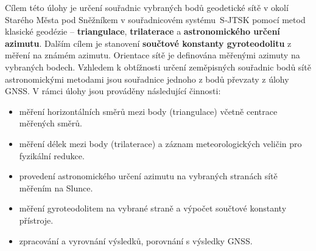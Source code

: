 
Cílem této úlohy je určení souřadnic vybraných bodů geodetické sítě v okolí Starého Města pod Sněžníkem v souřadnicovém systému~S‑JTSK pomocí metod klasické geodézie – \textbf{triangulace}, \textbf{trilaterace} a \textbf{astronomického určení azimutu}. Dalším cílem je stanovení \textbf{součtové konstanty gyroteodolitu} z měření na známém azimutu. Orientace sítě je definována měřenými azimuty na vybraných bodech. Vzhledem k obtížnosti určení zeměpisných souřadnic bodů sítě astronomickými metodami jsou souřadnice jednoho z bodů převzaty z úlohy GNSS. V rámci úlohy jsou prováděny následující činnosti:
\begin{itemize}
    \item měření horizontálních směrů mezi body (triangulace) včetně centrace měřených směrů.
    \item měření délek mezi body (trilaterace) a záznam meteorologických veličin pro fyzikální redukce.
    \item provedení astronomického určení azimutu na vybraných stranách sítě měřením na Slunce.
    \item měření gyroteodolitem na vybrané straně a výpočet součtové konstanty přístroje.
    \item zpracování a vyrovnání výsledků, porovnání s výsledky GNSS.
\end{itemize}
